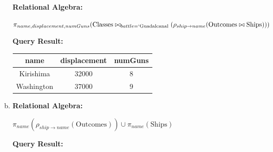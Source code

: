 \documentclass[12pt]{article}
\begin{document}
\begin{enumerate}
\begin{enumerate}[a)]
        \textbf{Relational Algebra:}

        \bigskip

        $\pi_{name,displacement,numGuns}(\text{Classes} \bowtie_{battle=`\text{Guadalcanal}} (\rho_{ship \to name} (\text{Outcomes} \bowtie \text{Ships})))$

        \bigskip

        \textbf{Query Result:}

        \bigskip

        \begin{tabular}{|c|c|c|}
            \hline
            name    &   displacement    &   numGuns\\
            \hline
            Kirishima   &   32000   &   8\\
            \hline
            Washington   &   37000   &   9\\
            \hline
        \end{tabular}

        \item

        \textbf{Relational Algebra:}

        \bigskip

        $\pi_{name}(\rho_{ship \to name}(\text{Outcomes})) \cup \pi_{name}(\text{Ships})$

        \bigskip

        \textbf{Query Result:}

        \bigskip


\end{enumerate}
\end{enumerate}
\end{document}
